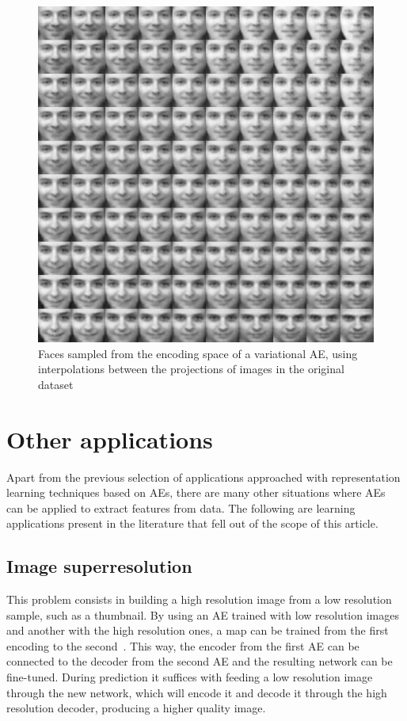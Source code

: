 \documentclass[
	fontsize=11pt, %
	twoside=false, %
	open=any, %
	secnumdepth=1, %
]{kaobook}
\begin{document}
\begin{figure}[ht!]
    \centering
    \includegraphics[width=\linewidth]{variational-matrix.png}
    \caption{\label{fig:sampledfaces}Faces sampled from the encoding space of a variational AE, using interpolations between the projections of images in the original dataset}
\end{figure}

\section{Other applications}\label{sec:oth}

Apart from the previous selection of applications approached with representation learning techniques based on AEs, there are many other situations where AEs can be applied to extract features from data. The following are learning applications present in the literature that fell out of the scope of this article.

\subsection{Image superresolution} This problem consists in building a high resolution image from a low resolution sample, such as a thumbnail. By using an AE trained with low resolution images and another with the high resolution ones, a map can be trained from the first encoding to the second~\cite{superresolution}. This way, the encoder from the first AE can be connected to the decoder from the second AE and the resulting network can be fine-tuned. During prediction it suffices with feeding a low resolution image through the new network, which will encode it and decode it through the high resolution decoder, producing a higher quality image.
\end{document}
